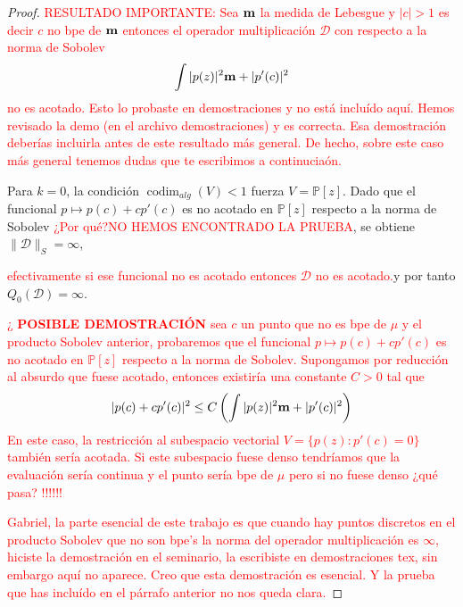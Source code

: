 \documentclass[12pt,a4paper]{article}
\theoremstyle{definition}
\theoremstyle{remark}
\begin{document}
\begin{proof}

\noindent \textcolor{red}{ RESULTADO IMPORTANTE: Sea ${\bf m}$ la medida de Lebesgue y $\vert c \vert >1$ es decir $c$ no bpe de ${\bf m}$ entonces el operador multiplicación $\mathcal{D}$ con respecto a la norma de Sobolev
$$ \int \vert p(z)\vert^2 {\bf m} + \vert p'(c) \vert^2$$
no es acotado. Esto lo probaste en demostraciones y no está incluído  aquí. Hemos revisado la demo (en el archivo demostraciones) y es correcta. Esa demostración deberías incluirla antes de este resultado más general. De hecho,  sobre este caso más general tenemos dudas que te escribimos a continuciaón.
}




	Para $k=0$, la condición $\operatorname{codim}_{alg}(V)<1$ fuerza $V=\mathbb{P}[z]$. Dado que el funcional $p \mapsto p(c)+cp'(c)$ es no acotado en $\mathbb{P}[z]$ respecto a la norma de Sobolev \textcolor{red}{¿Por qué?\textcolor{red}{NO HEMOS ENCONTRADO LA PRUEBA}}, se obtiene $\|\mathcal{D}\|_S=\infty$, 
    
    \textcolor{red}{efectivamente si ese funcional no es acotado entonces $\mathcal{D}$ no es acotado.}y por tanto $Q_0(\mathcal{D})=\infty$.


\textcolor{red}{¿ {\bf POSIBLE DEMOSTRACIÓN} sea $c$ un punto que no es bpe de $\mu$ y el producto Sobolev anterior, probaremos que el funcional $p \mapsto p(c)+cp'(c)$ es no acotado en $\mathbb{P}[z]$ respecto a la norma de Sobolev. Supongamos por reducción al absurdo que fuese acotado, entonces existiría una constante $C>0$ tal que 
$$
\vert p(c)+cp'(c) \vert^2 \leq C \left( \int \vert p(z)\vert^2 {\bf m} + \vert p'(c) \vert^2 \right)
$$
}
\noindent \textcolor{red}{En este caso, la restricción al subespacio vectorial $V=\{p(z): p'(c)=0\}$ también sería acotada. Si este subespacio fuese denso tendríamos que la evaluación sería continua y el punto sería bpe de $\mu$ pero si no fuese denso ¿qué pasa? !!!!!!}


\textcolor{red}{Gabriel, la parte esencial de este trabajo es que cuando hay puntos discretos en el producto Sobolev que no son bpe's la norma del operador multiplicación es $\infty$, hiciste la demostración en el seminario, la escribiste en demostraciones tex, sin embargo aquí no aparece. Creo que esta demostración es esencial. Y la prueba que has incluído en el párrafo anterior no nos queda clara.}


\end{proof}
\end{document}
